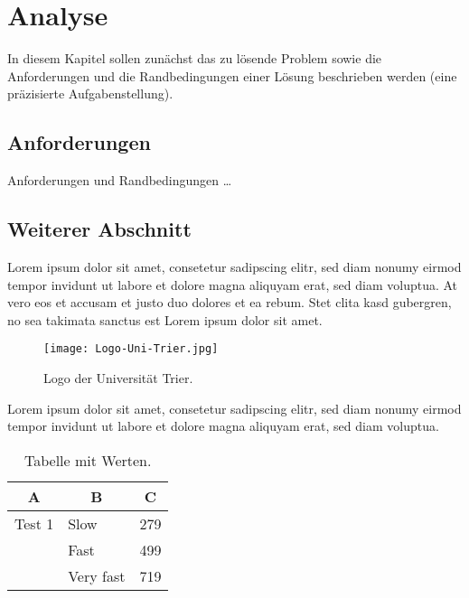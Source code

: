 
\chapter{Analyse}
\label{ch:Analyse}
In diesem Kapitel sollen zunächst das zu lösende Problem
sowie die Anforderungen und die Randbedingungen 
einer Lösung beschrieben werden (eine präzisierte Aufgabenstellung).


\section{Anforderungen}
\label{ch:Analyse:sec:Anforderungen}
Anforderungen und Randbedingungen \ldots

\section{Weiterer Abschnitt}
\label{ch:Analyse:sec:Abschnitt}

Lorem ipsum dolor sit amet, consetetur sadipscing elitr, sed diam nonumy eirmod tempor invidunt ut labore et dolore magna aliquyam erat, sed diam voluptua. At vero eos et accusam et justo duo dolores et ea rebum. Stet clita kasd gubergren, no sea takimata sanctus est Lorem ipsum dolor sit amet.

\begin{figure}[htb]
\centering
  	{\texttt{[image: Logo-Uni-Trier.jpg]}}
	\caption{Logo der Universität Trier.\label{fig:grafik1}}
\centering
\end{figure}

Lorem ipsum dolor sit amet, consetetur sadipscing elitr, sed diam nonumy eirmod tempor invidunt ut labore et dolore magna aliquyam erat, sed diam voluptua. 

\begin{table}[htb]
\caption{Tabelle mit Werten.\label{tab:liste}}
\vspace*{1em}
\centering

\bgroup
\def\arraystretch{1.3}%

\begin{tabular}[c]{l|l|c}
	
	\multicolumn{1}{c|}{\textbf{A}} & 
	\multicolumn{1}{c|}{\textbf{B}} & 
	\multicolumn{1}{c}{\textbf{C}} \\ 
	
	\hline

	Test 1& Slow& 279 \\ 
	&Fast & 499 \\ 
	&Very fast& 719 \\ 
	
\end{tabular}

\egroup

\end{table}

